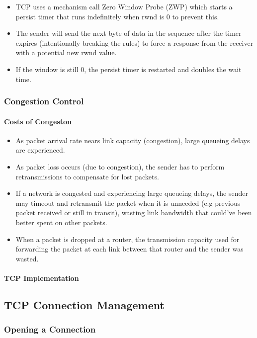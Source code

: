 \documentclass{article}
\begin{document}
\begin{itemize}
    \item TCP uses a mechanism call Zero Window Probe (ZWP) which starts a persist timer that runs indefinitely when rwnd is 0 to prevent this.
    \item The sender will send the next byte of data in the sequence after the timer expires (intentionally breaking the rules) to force a response from the receiver with a potential new rwnd value.
    \item If the window is still 0, the persist timer is restarted and doubles the wait time.
\end{itemize}

\subsubsection{Congestion Control}

\paragraph{Costs of Congeston}

\begin{itemize}
    \item As packet arrival rate nears link capacity (congestion), large queueing delays are experienced.
    \item As packet loss occurs (due to congestion), the sender has to perform retransmissions to compensate for lost packets.
    \item If a network is congested and experiencing large queueing delays, the sender may timeout and retransmit the packet when it is unneeded (e.g previous packet received or still in transit), wasting link bandwidth that could've been better spent on other packets.
    \item When a packet is dropped at a router, the transmission capacity used for forwarding the packet at each link between that router and the sender was wasted.
\end{itemize}

\paragraph{TCP Implementation}

\subsection{TCP Connection Management}

\subsubsection{Opening a Connection}
\end{document}
